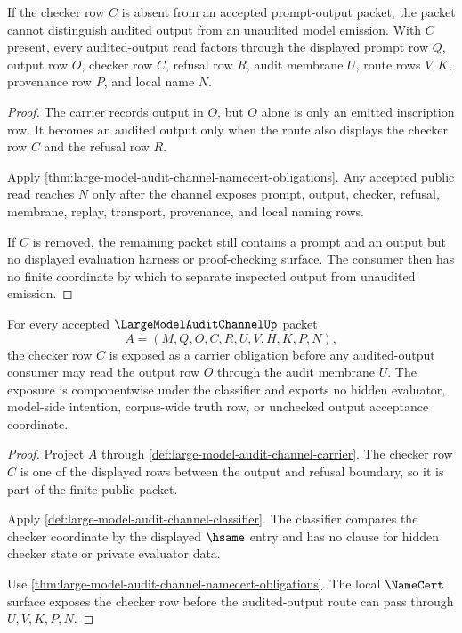\begin{theorem}
\label{thm:large-model-audit-channel-audited-output-boundary}
If the checker row $C$ is absent from an accepted prompt-output packet, the packet cannot distinguish audited output from an unaudited model emission. With $C$ present, every audited-output read factors through the displayed prompt row $Q$, output row $O$, checker row $C$, refusal row $R$, audit membrane $U$, route rows $V,K$, provenance row $P$, and local name $N$.
\end{theorem}
\begin{proof}
The carrier records output in $O$, but $O$ alone is only an emitted inscription row. It becomes an audited output only when the route also displays the checker row $C$ and the refusal row $R$.

Apply \autoref{thm:large-model-audit-channel-namecert-obligations}. Any accepted public read reaches $N$ only after the channel exposes prompt, output, checker, refusal, membrane, replay, transport, provenance, and local naming rows.

If $C$ is removed, the remaining packet still contains a prompt and an output but no displayed evaluation harness or proof-checking surface. The consumer then has no finite coordinate by which to separate inspected output from unaudited emission.
\end{proof}

\begin{theorem}
\label{thm:large-model-audit-channel-checker-exposure-obligation}
For every accepted $\LargeModelAuditChannelUp$ packet
$$
A=(M,Q,O,C,R,U,V,H,K,P,N),
$$
the checker row $C$ is exposed as a carrier obligation before any audited-output consumer may read the output row $O$ through the audit membrane $U$. The exposure is componentwise under the classifier and exports no hidden evaluator, model-side intention, corpus-wide truth row, or unchecked output acceptance coordinate.
\end{theorem}
\begin{proof}
Project $A$ through \autoref{def:large-model-audit-channel-carrier}. The checker row $C$ is one of the displayed rows between the output and refusal boundary, so it is part of the finite public packet.

Apply \autoref{def:large-model-audit-channel-classifier}. The classifier compares the checker coordinate by the displayed $\hsame$ entry and has no clause for hidden checker state or private evaluator data.

Use \autoref{thm:large-model-audit-channel-namecert-obligations}. The local $\NameCert$ surface exposes the checker row before the audited-output route can pass through $U,V,K,P,N$.
\end{proof}


